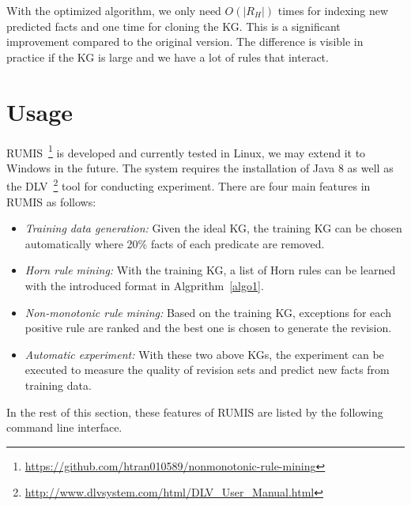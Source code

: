 With the optimized algorithm, we only need $O(|R_H|)$ times for indexing new predicted facts and one time for cloning the KG. This is a significant improvement compared to the original version. The difference is visible in practice if the KG is large and we have a lot of rules that interact.

\section{Usage}

RUMIS~\footnote{\url{https://github.com/htran010589/nonmonotonic-rule-mining}} is developed and currently tested in Linux, we may extend it to Windows in the future. The system requires the installation of Java 8 as well as the DLV~\footnote{\url{http://www.dlvsystem.com/html/DLV_User_Manual.html}} tool for conducting experiment. There are four main features in RUMIS as follows:

\begin{itemize}
\item \textit{Training data generation:} Given the ideal KG, the training KG can be chosen automatically where 20\% facts of each predicate are removed.
\item \textit{Horn rule mining:} With the training KG, a list of Horn rules can be learned with the introduced format in Algprithm~\ref{algo1}.
\item \textit{Non-monotonic rule mining:} Based on the training KG, exceptions for each positive rule are ranked and the best one is chosen to generate the revision.
\item \textit{Automatic experiment:} With these two above KGs, the experiment can be executed to measure the quality of revision sets and predict new facts from training data.
\end{itemize}

In the rest of this section, these features of RUMIS are listed by the following command line interface.

